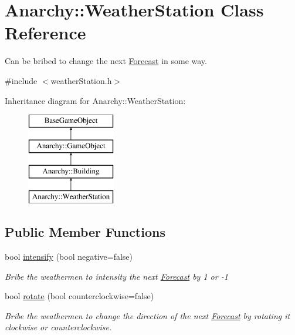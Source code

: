 \hypertarget{classAnarchy_1_1WeatherStation}{\section{Anarchy\-:\-:Weather\-Station Class Reference}
\label{classAnarchy_1_1WeatherStation}
}


Can be bribed to change the next \hyperlink{classAnarchy_1_1Forecast}{Forecast} in some way.  




{\ttfamily \#include $<$weather\-Station.\-h$>$}

Inheritance diagram for Anarchy\-:\-:Weather\-Station\-:\begin{figure}[H]
\begin{center}
\leavevmode
\includegraphics[height=4.000000cm]{classAnarchy_1_1WeatherStation}
\end{center}
\end{figure}
\subsection*{Public Member Functions}
\begin{DoxyCompactItemize}
\item 
bool \hyperlink{classAnarchy_1_1WeatherStation_aa1aee54cf7e190dcfbcbd46c893623df}{intensify} (bool negative=false)
\begin{DoxyCompactList}\small\item\em Bribe the weathermen to intensity the next \hyperlink{classAnarchy_1_1Forecast}{Forecast} by 1 or -\/1 \end{DoxyCompactList}\item 
bool \hyperlink{classAnarchy_1_1WeatherStation_a331b6a3cb2831fb40a9c0e083754ef78}{rotate} (bool counterclockwise=false)
\begin{DoxyCompactList}\small\item\em Bribe the weathermen to change the direction of the next \hyperlink{classAnarchy_1_1Forecast}{Forecast} by rotating it clockwise or counterclockwise. \end{DoxyCompactList}\end{DoxyCompactItemize}
